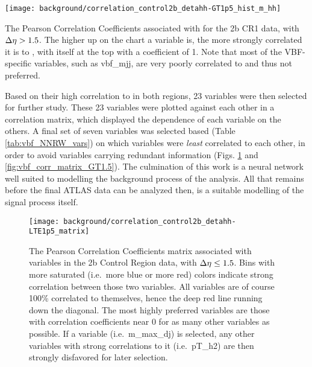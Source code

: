     \begin{sidewaysfigure}[tbh]
        \texttt{[image: background/correlation\_control2b\_detahh-GT1p5\_hist\_m\_hh]}
        \caption{
        }
        \label{fig:mhh_corrGT1.5}
            The Pearson Correlation Coefficients associated with \mhh for the 2b CR1 data,
                with $\Delta \eta > 1.5$.
            The higher up on the chart a variable is, the more strongly correlated it is to \mhh,
                with \mhh itself at the top with a coefficient of 1.
            Note that most of the VBF-specific variables, such as vbf\_mjj, are very poorly correlated to \mhh and thus not preferred.
    \end{sidewaysfigure}

    Based on their high correlation to \mhh in both \deta regions, 23 variables were then selected for further study.
    These 23 variables were plotted against each other in a correlation matrix,
        which displayed the dependence of each variable on the others.
    A final set of seven variables was selected based (Table \ref{tab:vbf_NNRW_vars}) on which variables were \textit{least} correlated to each other,
        in order to avoid variables carrying redundant information (Figs. \ref{fig:vbf_corr_matrix_LT1.5} and \ref{fig:vbf_corr_matrix_GT1.5}).
    The culmination of this work is a neural network well suited to modelling the background process of the analysis.
    All that remains before the final ATLAS data can be analyzed then,
        is a suitable modelling of the signal process itself.

    \begin{figure}[tbh]
        \texttt{[image: background/correlation\_control2b\_detahh-LTE1p5\_matrix]}
        \caption{
            The Pearson Correlation Coefficients matrix associated with variables in the 2b Control Region data,
                with $\Delta \eta \leq 1.5$.
            Bins with more saturated (i.e.\ more blue or more red) colors indicate strong correlation between those two variables.
            All variables are of course 100\% correlated to themselves, hence the deep red line running down the diagonal.
            The most highly preferred variables are those with correlation coefficients near 0 for as many other variables as possible.
            If a variable (i.e.\ m\_max\_dj) is selected, any other variables with strong correlations to it (i.e.\ pT\_h2)
                are then strongly disfavored for later selection.
        }
        \label{fig:vbf_corr_matrix_LT1.5}
    \end{figure}

